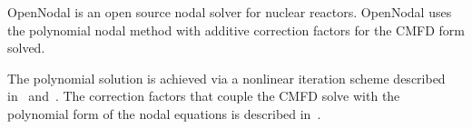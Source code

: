 OpenNodal is an open source nodal solver for nuclear reactors.
OpenNodal uses the polynomial nodal method with additive correction factors for the CMFD form solved.

The polynomial solution is achieved via a nonlinear iteration scheme described in~\cite{Smith1983Nonlinear} and~\cite{GehinPhD}.
The correction factors that couple the CMFD solve with the polynomial form of the nodal equations is described in~\cite{SmithMS}.